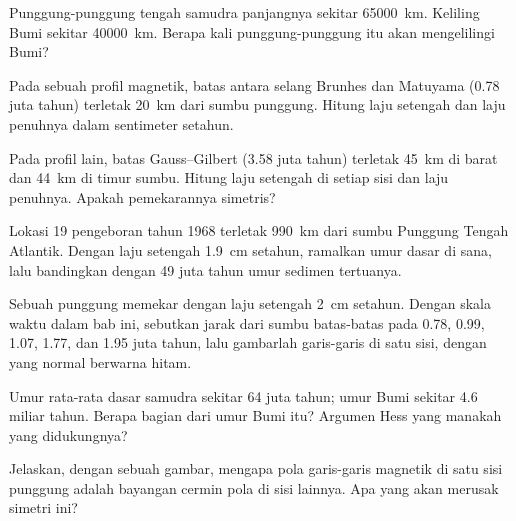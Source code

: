 \begin{exercise}[$\star$]\label{exo:g11:drift-to-spreading:5}
Punggung-punggung tengah samudra panjangnya sekitar \qty{65000}{km}. Keliling
Bumi sekitar \qty{40000}{km}. Berapa kali punggung-punggung itu akan
mengelilingi Bumi?
\end{exercise}

\begin{exercise}[$\star\star$]\label{exo:g11:drift-to-spreading:6}
Pada sebuah profil magnetik, batas antara selang Brunhes dan Matuyama
(\num{0.78} juta tahun) terletak \qty{20}{km} dari sumbu punggung. Hitung laju
setengah dan laju penuhnya dalam sentimeter setahun.
\end{exercise}

\begin{exercise}[$\star\star$]\label{exo:g11:drift-to-spreading:7}
Pada profil lain, batas Gauss--Gilbert (\num{3.58} juta tahun) terletak
\qty{45}{km} di barat dan \qty{44}{km} di timur sumbu. Hitung laju setengah di
setiap sisi dan laju penuhnya. Apakah pemekarannya simetris?
\end{exercise}

\begin{exercise}[$\star\star$]\label{exo:g11:drift-to-spreading:8}
Lokasi 19 pengeboran tahun 1968 terletak \qty{990}{km} dari sumbu Punggung
Tengah Atlantik. Dengan laju setengah \qty{1.9}{cm} setahun, ramalkan umur
dasar di sana, lalu bandingkan dengan \num{49} juta tahun umur sedimen
tertuanya.
\end{exercise}

\begin{exercise}[$\star\star$]\label{exo:g11:drift-to-spreading:9}
Sebuah punggung memekar dengan laju setengah \qty{2}{cm} setahun. Dengan skala
waktu dalam bab ini, sebutkan jarak dari sumbu batas-batas pada 0.78, 0.99,
1.07, 1.77, dan 1.95 juta tahun, lalu gambarlah garis-garis di satu sisi,
dengan yang normal berwarna hitam.
\end{exercise}

\begin{exercise}[$\star\star$]\label{exo:g11:drift-to-spreading:10}
Umur rata-rata dasar samudra sekitar \num{64} juta tahun; umur Bumi sekitar
\num{4.6} miliar tahun. Berapa bagian dari umur Bumi itu? Argumen Hess yang
manakah yang didukungnya?
\end{exercise}

\begin{exercise}[$\star\star$]\label{exo:g11:drift-to-spreading:11}
Jelaskan, dengan sebuah gambar, mengapa pola garis-garis magnetik di satu sisi
punggung adalah bayangan cermin pola di sisi lainnya. Apa yang akan merusak
simetri ini?
\end{exercise}

